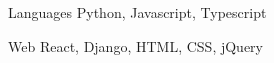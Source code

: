 



\begin{cvskills}


  \cvskill
    {Languages} %
    {Python, Javascript, Typescript} %


  \cvskill
    {Web} %
    {React, Django, HTML, CSS, jQuery} %


\end{cvskills}
